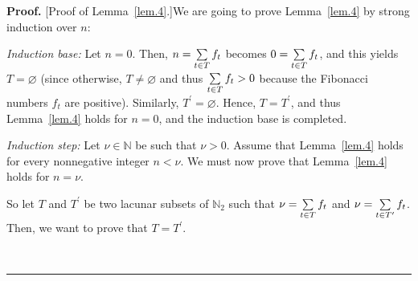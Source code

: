 \documentclass[numbers=enddot,12pt,final,onecolumn,notitlepage]{scrartcl}%
\numberwithin{exer}{section}
\theoremstyle{definition}
\newenvironment{proof}[1][Proof]{\noindent\textbf{#1.} }{\ \rule{0.5em}{0.5em}}
\let\sumnonlimits\sum
\renewcommand{\sum}{\sumnonlimits\limits}
\begin{document}
\begin{proof}
[Proof of Lemma~\ref{lem.4}.]We are going to prove Lemma~\ref{lem.4} by strong
induction over $n$:

\textit{Induction base:} Let $n=0$. Then, $n=\sum\limits_{t\in T}f_{t}$
becomes $0=\sum\limits_{t\in T}f_{t}$, and this yields $T=\varnothing$ (since
otherwise, $T\neq\varnothing$ and thus $\sum\limits_{t\in T}f_{t}>0$ because
the Fibonacci numbers $f_{t}$ are positive). Similarly, $T^{\prime
}=\varnothing$. Hence, $T=T^{\prime}$, and thus Lemma~\ref{lem.4} holds for
$n=0$, and the induction base is completed.

\textit{Induction step:} Let $\nu\in\mathbb{N}$ be such that $\nu>0$. Assume
that Lemma~\ref{lem.4} holds for every nonnegative integer $n<\nu$. We must
now prove that Lemma~\ref{lem.4} holds for $n=\nu$.

So let $T$ and $T^{\prime}$ be two lacunar subsets of $\mathbb{N}_{2}$ such
that $\nu=\sum\limits_{t\in T}f_{t}$ and $\nu=\sum\limits_{t\in T^{\prime}%
}f_{t}$. Then, we want to prove that $T=T^{\prime}$.


\end{proof}
\end{document}
